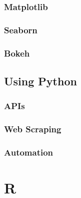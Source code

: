 \documentclass[
]{book}
\begin{document}
\hypertarget{matplotlib}{%
\subsection{Matplotlib}\label{matplotlib}}

\hypertarget{seaborn}{%
\subsection{Seaborn}\label{seaborn}}

\hypertarget{bokeh}{%
\subsection{Bokeh}\label{bokeh}}

\hypertarget{using-python}{%
\section{Using Python}\label{using-python}}

\hypertarget{apis}{%
\subsection{APIs}\label{apis}}

\hypertarget{web-scraping}{%
\subsection{Web Scraping}\label{web-scraping}}

\hypertarget{automation}{%
\subsection{Automation}\label{automation}}

\hypertarget{r}{%
\chapter{R}\label{r}}

  
\end{document}
